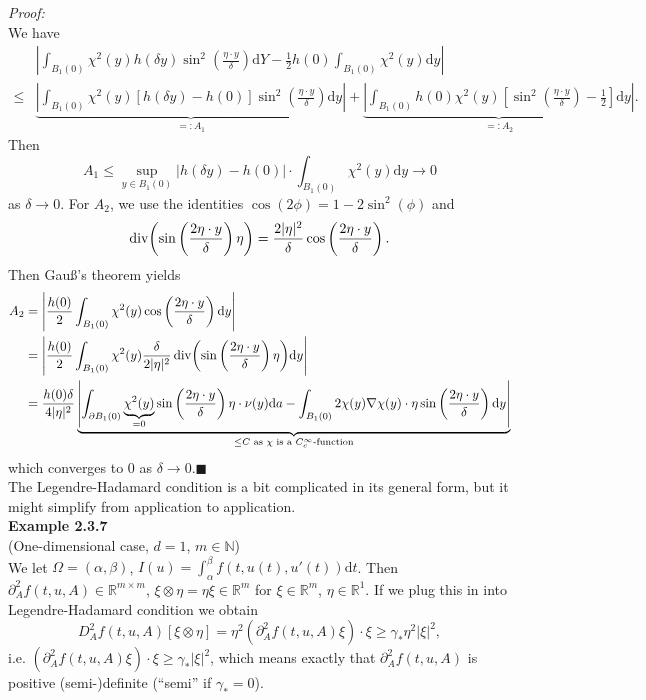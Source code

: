 \textit{Proof:}\\
We have
\begin{align*}
	&\left\lvert\int_{B_1(0)}{\chi^2(y)h(\delta y)\sin^2\left(\frac{\eta\cdot y}{\delta}\right)\mathrm{d}Y}-\frac{1}{2}h(0)\int_{B_1(0)}{\chi^2(y)\mathrm{d}y}\right\rvert\\
	\leq&\underbrace{\left\lvert\int_{B_1(0)}{\chi^2(y)[h(\delta y)-h(0)]\sin^2\left(\frac{\eta\cdot y}{\delta}\right)\mathrm{d}y}\right\rvert}_{=:A_1}+\underbrace{\left\lvert\int_{B_1(0)}{h(0)\chi^2(y)\left[\sin^2\left(\frac{\eta\cdot y}{\delta}\right)-\frac{1}{2}\right]\mathrm{d}y}\right\rvert}_{=:A_2}.
\end{align*}
Then
\[A_1\leq\sup_{y\in B_1(0)}{\lvert h(\delta y)-h(0)\rvert}\cdot\int_{B_1(0)}{\chi^2(y)\mathrm{d}y}\to0\]
as $\delta\to0$. For $A_2$, we use the identities $\cos(2\phi)=1-2\sin^2(\phi)$ and
\[\operatorname{div}\mathopen{}\left(\sin\left(\frac{2\eta\cdot y}{\delta}\right)\eta\right)\mathclose{}=\frac{2\lvert\eta\rvert^2}{\delta}\cos\left(\frac{2\eta\cdot y}{\delta}\right).\]
Then Gau{\ss}'s theorem yields
\begin{align*}
	A_2&=\left\lvert\frac{h(0)}{2}\int_{B_1(0)}{\chi^2(y)\cos\left(\frac{2\eta\cdot y}{\delta}\right)\mathrm{d}y}\right\rvert\\
	&=\left\lvert\frac{h(0)}{2}\int_{B_1(0)}{\chi^2(y)\frac{\delta}{2\lvert\eta\rvert^2}\operatorname{div}\mathopen{}\left(\sin\left(\frac{2\eta\cdot y}{\delta}\right)\eta\right)\mathclose{}\mathrm{d}y}\right\rvert\\
	&=\frac{h(0)\delta}{4\lvert\eta\rvert^2}\underbrace{\left\lvert\int_{\partial B_1(0)}{\underbrace{\chi^2(y)}_{=0}\sin\left(\frac{2\eta\cdot y}{\delta}\right)\eta\cdot\nu(y)\mathrm{d}a}-\int_{B_1(0)}{2\chi(y)\nabla\chi(y)\cdot\eta\sin\left(\frac{2\eta\cdot y}{\delta}\right)\mathrm{d}y}\right\rvert}_{\leq C\text{ as }\chi\text{ is a }C_c^\infty\text{-function}}
\end{align*}
which converges to 0 as $\delta\to0$.\hfill$\blacksquare$\\[11pt]

The Legendre-Hadamard condition is a bit complicated in its general form, but it might simplify from application to application.\\[11pt]

\textbf{Example 2.3.7}\\
(One-dimensional case, $d=1$, $m\in\mathbb{N}$)\\
We let $\Omega=(\alpha,\beta)$, $I(u)=\int_\alpha^\beta{f(t,u(t),u'(t))\mathrm{d}t}$. Then $\partial_A^2f(t,u,A)\in\mathbb{R}^{m\times m}$, $\xi\otimes\eta=\eta\xi\in\mathbb{R}^m$ for $\xi\in\mathbb{R}^m$, $\eta\in\mathbb{R}^1$. If we plug this in into Legendre-Hadamard condition we obtain
\[D_A^2f(t,u,A)[\xi\otimes\eta]=\eta^2(\partial_A^2f(t,u,A)\xi)\cdot\xi\geq\gamma_*\eta^2\lvert\xi\rvert^2,\]
i.e. $(\partial_A^2f(t,u,A)\xi)\cdot\xi\geq\gamma_*\lvert\xi\rvert^2$, which means exactly that $\partial_A^2f(t,u,A)$ is positive (semi-)definite (``semi'' if $\gamma_*=0$).\\[11pt]

